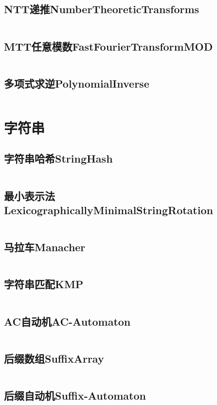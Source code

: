 \documentclass[10pt,a4paper,twoside]{ctexart}
\renewcommand{\_}{\textscale{1}{\textunderscore}} %
\begin{document}
\subsection{NTT递推Number\_Theoretic\_Transforms}
\inputminted{c++}{../多项式/NTT递推Number_Theoretic_Transforms.cpp}
\subsection{MTT任意模数Fast\_Fourier\_Transform\_MOD}
\inputminted{c++}{../多项式/MTT任意模数Fast_Fourier_Transform_MOD.cpp}
\subsection{多项式求逆Polynomial\_Inverse}
\inputminted{c++}{../多项式/多项式求逆Polynomial_Inverse.cpp}

\newpage
\section{字符串}
\subsection{字符串哈希String\_Hash}
\inputminted{c++}{../字符串/字符串哈希String_Hash.cpp}
\subsection{最小表示法Lexicographically\_Minimal\_String\_Rotation}
\inputminted{c++}{../字符串/最小表示法Lexicographically_Minimal_String_Rotation.cpp}
\subsection{马拉车Manacher}
\inputminted{c++}{../字符串/马拉车Manacher.cpp}
\subsection{字符串匹配KMP}
\inputminted{c++}{../字符串/字符串匹配KMP.cpp}
\subsection{AC自动机AC-Automaton}
\inputminted{c++}{../字符串/AC自动机AC-Automaton.cpp}
\subsection{后缀数组Suffix\_Array}
\inputminted{c++}{../字符串/后缀数组Suffix_Array.cpp}
\subsection{后缀自动机Suffix-Automaton}
\inputminted{c++}{../字符串/后缀自动机Suffix-Automaton.cpp}
\end{document}

